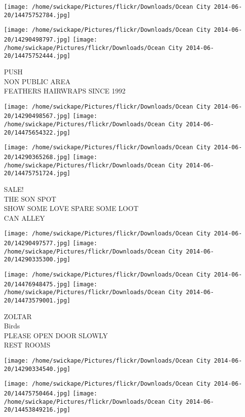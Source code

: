 \documentclass[10pt,letterpaper]{article}
\begin{document}
\texttt{[image: /home/swickape/Pictures/flickr/Downloads/Ocean City 2014-06-20/14475752784.jpg]}

\vspace{0.25in}
\texttt{[image: /home/swickape/Pictures/flickr/Downloads/Ocean City 2014-06-20/14290498797.jpg]}
\texttt{[image: /home/swickape/Pictures/flickr/Downloads/Ocean City 2014-06-20/14475752444.jpg]}

PUSH\\
NON PUBLIC AREA\\
FEATHERS HAIRWRAPS SINCE 1992\\
\pagebreak

\texttt{[image: /home/swickape/Pictures/flickr/Downloads/Ocean City 2014-06-20/14290498567.jpg]}
\texttt{[image: /home/swickape/Pictures/flickr/Downloads/Ocean City 2014-06-20/14475654322.jpg]}

\texttt{[image: /home/swickape/Pictures/flickr/Downloads/Ocean City 2014-06-20/14290365268.jpg]}
\texttt{[image: /home/swickape/Pictures/flickr/Downloads/Ocean City 2014-06-20/14475751724.jpg]}

SALE!\\
THE SON SPOT\\
SHOW SOME LOVE SPARE SOME LOOT\\
CAN ALLEY\\
\pagebreak

\texttt{[image: /home/swickape/Pictures/flickr/Downloads/Ocean City 2014-06-20/14290497577.jpg]}
\texttt{[image: /home/swickape/Pictures/flickr/Downloads/Ocean City 2014-06-20/14290335300.jpg]}

\texttt{[image: /home/swickape/Pictures/flickr/Downloads/Ocean City 2014-06-20/14476948475.jpg]}
\texttt{[image: /home/swickape/Pictures/flickr/Downloads/Ocean City 2014-06-20/14473579001.jpg]}

ZOLTAR\\
Birds\\
PLEASE OPEN DOOR SLOWLY\\
REST ROOMS\\
\pagebreak

\texttt{[image: /home/swickape/Pictures/flickr/Downloads/Ocean City 2014-06-20/14290334540.jpg]}

\vspace{0.25in}
\texttt{[image: /home/swickape/Pictures/flickr/Downloads/Ocean City 2014-06-20/14475750464.jpg]}
\texttt{[image: /home/swickape/Pictures/flickr/Downloads/Ocean City 2014-06-20/14453849216.jpg]}
\end{document}
